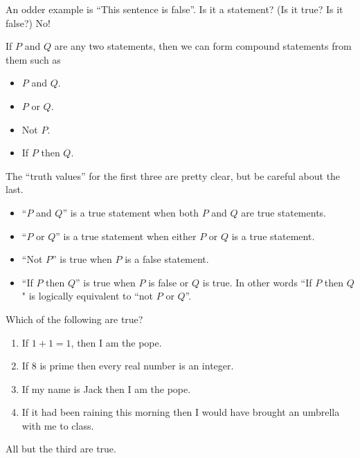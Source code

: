 \documentclass[12pt]{amsart}
\numberwithin{equation}{section}
\theoremstyle{plain} %
\theoremstyle{definition}
\theoremstyle{remark}
\begin{document}
An odder example is ``This sentence is false''. Is it a statement? (Is it true? Is it false?) No!


If $P$ and $Q$ are any two statements, then we can form compound statements from them such as
\begin{itemize}
	\item $P$ and $Q$.
	\item $P$ or $Q$.
	\item Not $P$.
	\item If $P$ then $Q$.
\end{itemize}

The ``truth values'' for the first three are pretty clear, but be careful about the last.

\begin{itemize}
	\item ``$P$ and $Q$'' is a true statement when both $P$ and $Q$ are true statements.
	\item ``$P$ or $Q$'' is a true statement when either $P$ or $Q$ is a true statement.
	\item ``Not $P$'' is true when $P$ is a false statement.
	\item ``If $P$ then $Q$'' is true when $P$ is false or $Q$ is true.  In other words
	``If $P$ then $Q$" is logically equivalent to ``not $P$ or $Q$''. 
\end{itemize}

 

Which of the following are true?

\begin{enumerate}
	
	\item If $1 + 1 = 1$, then I am the pope.
	
	\item If $8$ is prime then every real number is an integer.
	
	\item If my name is Jack then I am the pope.
	
	\item If it had been raining this morning then I would have brought an umbrella with me to class.
	
\end{enumerate}

All but the third are true.
\end{document}
